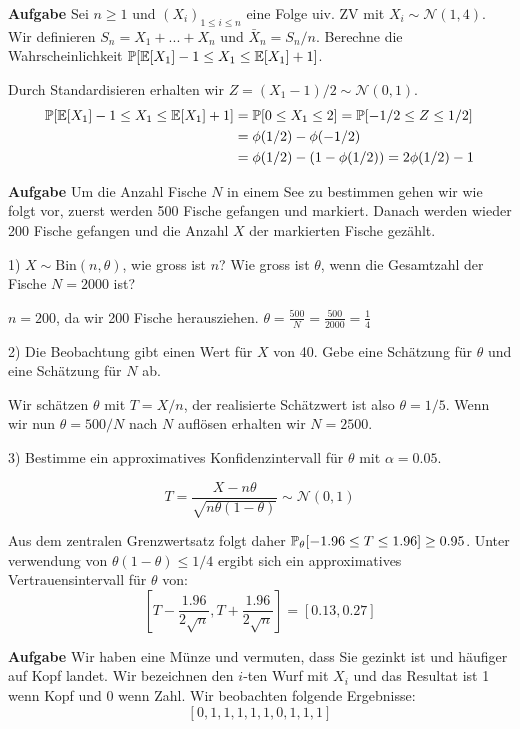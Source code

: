 \hrulefill

\textbf{Aufgabe}
Sei $n \geq 1$ und $(X_i)_{1 \leq i \leq n}$ eine Folge uiv. ZV mit $X_i \sim \mathcal{N}(1,4)$. Wir definieren $S_n = X_1 + ... + X_n$ und $\bar{X}_n = S_n / n$. Berechne die Wahrscheinlichkeit $\mathbb{P}[\mathbb{E}[X_1] - 1 \leq X_1 \leq \mathbb{E}[X_1] + 1]$. \medskip

Durch Standardisieren erhalten wir $Z = (X_1 - 1) / 2 \sim \mathcal{N}(0,1)$.
\begin{align*}
	\mathbb{P}[\mathbb{E}[X_1] - 1 \leq X_1 \leq \mathbb{E}[X_1] + 1] &= \mathbb{P}[0 \leq X_1 \leq 2] = \mathbb{P}[-1/2 \leq Z \leq 1/2] \\
	&= \phi(1/2) - \phi(-1/2) \\
	&= \phi(1/2) - (1 - \phi(1/2)) = 2 \phi(1/2) - 1
\end{align*}

\hrulefill

\textbf{Aufgabe}
Um die Anzahl Fische $N$ in einem See zu bestimmen gehen wir wie folgt vor, zuerst werden 500 Fische gefangen und markiert. Danach werden wieder 200 Fische gefangen und die Anzahl $X$ der markierten Fische gezählt. \smallskip

1) $X \sim \text{Bin}(n, \theta)$, wie gross ist $n$? Wie gross ist $\theta$, wenn die Gesamtzahl der Fische $N = 2000$ ist?

$n = 200$, da wir 200 Fische herausziehen. $\theta = \frac{500}{N} = \frac{500}{2000} = \frac{1}{4}$ \smallskip

2) Die Beobachtung gibt einen Wert für $X$ von 40. Gebe eine Schätzung für $\theta$ und eine Schätzung für $N$ ab.

Wir schätzen $\theta$ mit $T = X / n$, der realisierte Schätzwert ist also $\theta = 1/5$. Wenn wir nun $\theta = 500 / N$ nach $N$ auflösen erhalten wir $N = 2500$. \smallskip

3) Bestimme ein approximatives Konfidenzintervall für $\theta$ mit $\alpha = 0.05$.

$$T = \frac{X - n \theta}{\sqrt{n\theta(1-\theta)}} \sim \mathcal N (0,1)$$

Aus dem zentralen Grenzwertsatz folgt daher $\mathbb{P}_\theta [-1.96 \leq T \leq 1.96] \geq 0.95$. Unter verwendung von $\theta(1- \theta) \leq 1/4$ ergibt sich ein approximatives Vertrauensintervall für $\theta$ von:
$$[T - \frac{1.96}{2\sqrt{n}}, T + \frac{1.96}{2 \sqrt{n}}] = [0.13, 0.27]$$

\hrulefill

\textbf{Aufgabe}
Wir haben eine Münze und vermuten, dass Sie gezinkt ist und häufiger auf Kopf landet. Wir bezeichnen den $i$-ten Wurf mit $X_i$ und das Resultat ist 1 wenn Kopf und 0 wenn Zahl. Wir beobachten folgende Ergebnisse:
$$[0,1,1,1,1,1,0,1,1,1]$$

